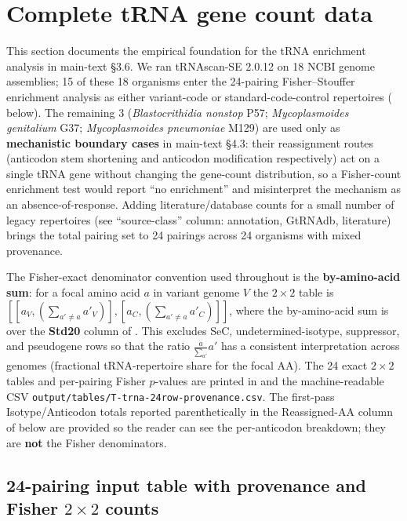 \documentclass[preprint,11pt,authoryear,a4paper]{elsarticle}
\begin{document}
\section{Complete tRNA gene count data}\label{sec:s-trna}

This section documents the empirical foundation for the tRNA enrichment
analysis in main-text §3.6. We ran tRNAscan-SE 2.0.12 on 18 NCBI genome
assemblies; 15 of these 18 organisms enter the 24-pairing
Fisher--Stouffer enrichment analysis as either variant-code or
standard-code-control repertoires ( below).
The remaining 3 (\emph{Blastocrithidia nonstop} P57;
\emph{Mycoplasmoides genitalium} G37; \emph{Mycoplasmoides pneumoniae}
M129) are used only as \textbf{mechanistic boundary cases} in main-text
§4.3: their reassignment routes (anticodon stem shortening and anticodon
modification respectively) act on a single tRNA gene without changing
the gene-count distribution, so a Fisher-count enrichment test would
report ``no enrichment'' and misinterpret the mechanism as an
absence-of-response. Adding literature/database counts for a small
number of legacy repertoires (see 
``source-class'' column: annotation, GtRNAdb, literature) brings the
total pairing set to 24 pairings across 24 organisms with mixed
provenance.

The Fisher-exact denominator convention used throughout is the
\textbf{by-amino-acid sum}: for a focal amino acid \(a\) in variant
genome \(V\) the \(2 \times 2\) table is
\(\left\lbrack \left\lbrack a_{V},\left( \sum_{a' \neq a}a'_{V} \right) \right\rbrack,\left\lbrack a_{C},\left( \sum_{a' \neq a}a'_{C} \right) \right\rbrack \right\rbrack\),
where the by-amino-acid sum is over the \textbf{Std20} column of
. This excludes SeC, undetermined-isotype, suppressor,
and pseudogene rows so that the ratio \(\frac{a}{\sum_{a'}}a'\) has a
consistent interpretation across genomes (fractional tRNA-repertoire
share for the focal AA). The 24 exact \(2 \times 2\) tables and
per-pairing Fisher \(p\)-values are printed in
 and the machine-readable CSV
\texttt{output/tables/T-trna-24row-provenance.csv}. The first-pass
Isotype/Anticodon totals reported parenthetically in the Reassigned-AA
column of  below are provided so the reader can see
the per-anticodon breakdown; they are \textbf{not} the Fisher
denominators.

\subsection{\texorpdfstring{24-pairing input table with provenance and
Fisher \(2 \times 2\)
counts}{24-pairing input table with provenance and Fisher 2 \textbackslash times 2 counts}}\label{sec:s-trna-provenance}
\end{document}
